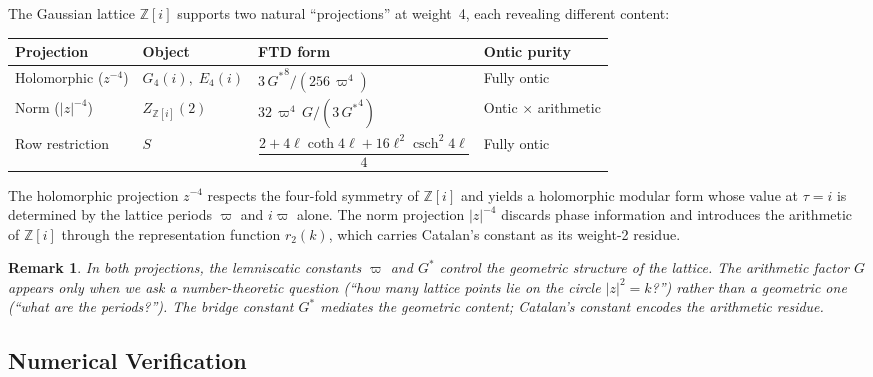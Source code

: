 \documentclass[12pt]{article}
\newtheorem{remark}[theorem]{Remark}
\newcommand{\Z}{\mathbb{Z}}
\DeclareMathOperator{\csch}{csch}
\begin{document}
The Gaussian lattice $\Z[i]$ supports two natural ``projections'' at
weight~4, each revealing different content:

\medskip
\begin{center}
\begin{tabular}{@{}llll@{}}
\toprule
\textbf{Projection} & \textbf{Object} & \textbf{FTD form} & \textbf{Ontic purity}\\
\midrule
Holomorphic ($z^{-4}$) & $G_4(i),\;E_4(i)$
  & $3\,{G^{*}}^8/(256\,\varpi^4)$
  & Fully ontic\\[3pt]
Norm ($|z|^{-4}$) & $Z_{\Z[i]}(2)$
  & $32\,\varpi^4\,G/(3\,{G^{*}}^4)$
  & Ontic $\times$ arithmetic\\[3pt]
Row restriction & $S$
  & $\dfrac{2+4\ell\coth 4\ell+16\ell^2\csch^2 4\ell}{4}$
  & Fully ontic\\
\bottomrule
\end{tabular}
\end{center}
\medskip

The holomorphic projection $z^{-4}$ respects the four-fold symmetry of
$\Z[i]$ and yields a holomorphic modular form whose value at $\tau=i$ is
determined by the lattice periods $\varpi$ and $i\varpi$ alone.  The norm
projection $|z|^{-4}$ discards phase information and introduces the
arithmetic of $\Z[i]$ through the representation function $r_2(k)$, which
carries Catalan's constant as its weight-2 residue.

\begin{remark}\label{rem:bridge-is-Gstar}
In both projections, the lemniscatic constants $\varpi$ and ${G^{*}}$ control
the geometric structure of the lattice.  The \emph{arithmetic} factor $G$
appears only when we ask a number-theoretic question (``how many lattice
points lie on the circle $|z|^2=k$?'') rather than a geometric one
(``what are the periods?'').  The bridge constant ${G^{*}}$ mediates the
geometric content; Catalan's constant encodes the arithmetic residue.
\end{remark}

\subsection{Numerical Verification}\label{sec:numerical-ext}
\end{document}
